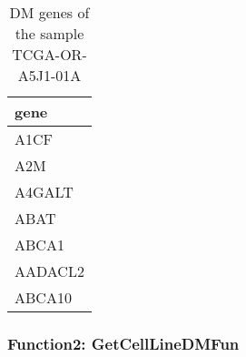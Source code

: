 \documentclass[]{article}
\begin{document}
\begin{table}

\caption{\label{tab:unnamed-chunk-81}DM genes of the sample TCGA-OR-A5J1-01A}
\centering
\begin{tabular}[t]{l}
\hline
gene\\
\hline
A1CF\\
\hline
A2M\\
\hline
A4GALT\\
\hline
ABAT\\
\hline
ABCA1\\
\hline
AADACL2\\
\hline
ABCA10\\
\hline
\end{tabular}
\end{table}

\hypertarget{function2-getcelllinedmfun}{%
\subsubsection{\texorpdfstring{ Function2: GetCellLineDMFun}{  Function2: GetCellLineDMFun}}\label{function2-getcelllinedmfun}}
\end{document}
